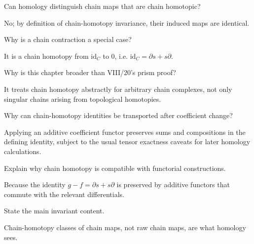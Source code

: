 \begin{problem}\label{prob:viii22-19}
Can homology distinguish chain maps that are chain homotopic?
\end{problem}
\begin{solution}
No; by definition of chain-homotopy invariance, their induced maps are identical.
\end{solution}

\begin{problem}[Bridge]\label{prob:viii22-20}
Why is a chain contraction a special case?
\end{problem}
\begin{solution}
It is a chain homotopy from \(\mathrm{id}_C\) to \(0\), i.e. \(\mathrm{id}_C=\partial s+s\partial\).
\end{solution}

\begin{problem}\label{prob:viii22-21}
Why is this chapter broader than VIII/20's prism proof?
\end{problem}
\begin{solution}
It treats chain homotopy abstractly for arbitrary chain complexes, not only singular chains arising from topological homotopies.
\end{solution}

\begin{problem}\label{prob:viii22-22}
Why can chain-homotopy identities be transported after coefficient change?
\end{problem}
\begin{solution}
Applying an additive coefficient functor preserves sums and compositions in the defining identity, subject to the usual tensor exactness caveats for later homology calculations.
\end{solution}

\begin{problem}[Naturality]\label{prob:viii22-23}
Explain why chain homotopy is compatible with functorial constructions.
\end{problem}
\begin{solution}
Because the identity \(g-f=\partial s+s\partial\) is preserved by additive functors that commute with the relevant differentials.
\end{solution}

\begin{problem}\label{prob:viii22-24}
State the main invariant content.
\end{problem}
\begin{solution}
Chain-homotopy classes of chain maps, not raw chain maps, are what homology sees.
\end{solution}
